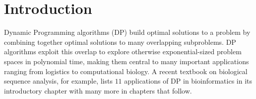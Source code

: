 \section{Introduction}
\label{intro}


\newcommand{\xidx}{i}
\newcommand{\yidx}{j}
\newcommand{\xw}[1]{w_{#1}}
\newcommand{\yw}[1]{w'_{#1}}

Dynamic Programming algorithms (DP) build optimal solutions to a problem by combining
together optimal solutions to many overlapping subproblems.  DP
algorithms exploit this overlap to explore otherwise exponential-sized
problem spaces in polynomial time, making them central to many
important applications ranging from logistics to computational
biology. A recent textbook \cite{DurbinEdKr98} on biological sequence analysis, for example,
lists $11$ applications of DP in bioinformatics in its introductory
chapter with many more in chapters that follow.


